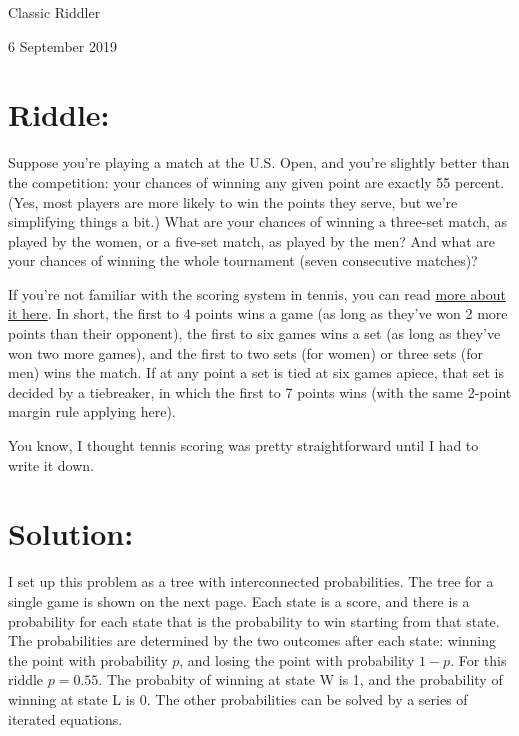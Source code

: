 \documentclass{article}
\begin{document}
\pagestyle{empty} %

\begin{center}
{\LARGE Classic Riddler}

\vspace{0.15in}

{\Large 6 September 2019}
\end{center}


\section*{Riddle:}

Suppose you're playing a match at the U.S. Open, and you're slightly better than the competition: your chances of winning any given point are exactly 55 percent.
(Yes, most players are more likely to win the points they serve, but we're simplifying things a bit.)
What are your chances of winning a three-set match, as played by the women, or a five-set match, as played by the men?
And what are your chances of winning the whole tournament (seven consecutive matches)?

If you're not familiar with the scoring system in tennis, you can read \href{https://www.usta.com/en/home/improve/tips-and-instruction/national/tennis-101--scoring.html}{more about it here}.
In short, the first to 4 points wins a game (as long as they've won 2 more points than their opponent), the first to six games wins a set (as long as they've won two more games), and the first to two sets (for women) or three sets (for men) wins the match.
If at any point a set is tied at six games apiece, that set is decided by a tiebreaker, in which the first to 7 points wins (with the same 2-point margin rule applying here).

You know, I thought tennis scoring was pretty straightforward until I had to write it down.


\section*{Solution:}

I set up this problem as a tree with interconnected probabilities.
The tree for a single game is shown on the next page.
Each state is a score, and there is a probability for each state that is the probability to win starting from that state.
The probabilities are determined by the two outcomes after each state: winning the point with probability $p$, and losing the point with probability $1-p$.
For this riddle $p=0.55$.
The probabity of winning at state W is 1, and the probability of winning at state L is 0.
The other probabilities can be solved by a series of iterated equations.
\end{document}
